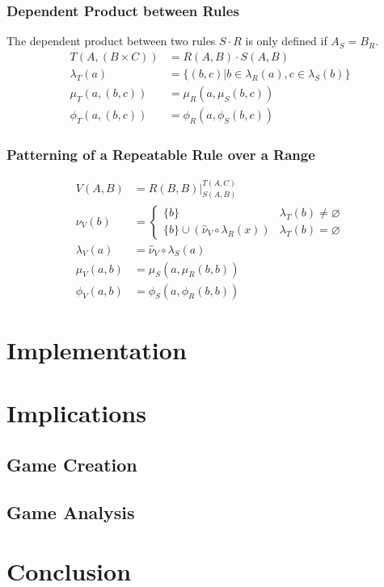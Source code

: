 \documentclass{article}
\begin{document}
\subsubsection{Dependent Product between Rules}
The dependent product between two rules $ S \cdot R $ is only defined if $ A_S = B_R $.
\begin{align*}
          T (A, (B \times C)) & = R (A, B) \cdot S (A, B) \\
  \lambda_T (a)               & = \{ (b,c) | b \in \lambda_R (a), c \in \lambda_S (b) \} \\
      \mu_T (a, (b, c))       & =   \mu_R (a,  \mu_S (b, c)) \\
     \phi_T (a, (b, c))       & =  \phi_R (a, \phi_S (b, c)) 
\end{align*}

\subsubsection{Patterning of a Repeatable Rule over a Range}

\begin{align*}
     V (A, B)    & = R (B, B) \bigg\rvert_{S (A, B)}^{T (A, C)} \\
    \nu_V (b)    & = \begin{cases} \{ b \} & \lambda_T (b) \neq \varnothing \\ \{ b \} \cup (\widehat{\nu}_V \circ \lambda_R (x)) & \lambda_T (b) = \varnothing \end{cases} \\
\lambda_V (a)    & = \widehat{\nu}_V \circ \lambda_S (a) \\
    \mu_V (a, b) & =  \mu_S (a,  \mu_R(b, b)) \\
   \phi_V (a, b) & = \phi_S (a, \phi_R(b, b)) 
\end{align*}

\section{Implementation}

\section{Implications}

\subsection{Game Creation}

\subsection{Game Analysis}

\section{Conclusion}
\end{document}
